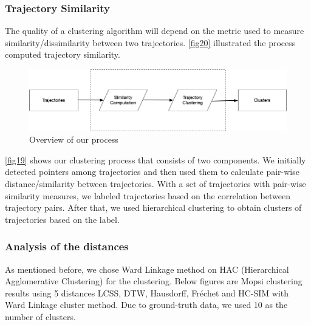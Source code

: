\documentclass[a4paper, 12pt]{article}
\begin{document}
\subsubsection{Trajectory Similarity}

The quality of a clustering algorithm will depend on the metric used to measure similarity/dissimilarity between two trajectories. \autoref{fig20} illustrated the process computed trajectory similarity.

\begin{figure}[ht]
    \centering
    \includegraphics[width=1\textwidth]{Process.png}
    \caption{Overview of our process}
    \label{fig19}
\end{figure}

\autoref{fig19} shows our clustering process that consists of two components. We initially detected pointers among trajectories and then used them to calculate pair-wise distance/similarity between trajectories. With a set of trajectories with pair-wise similarity measures, we labeled trajectories based on the correlation between trajectory pairs. After that, we used hierarchical clustering to obtain clusters of trajectories based on the label.

\subsubsection{Analysis of the distances}

As mentioned before, we chose Ward Linkage method on HAC (Hierarchical Agglomerative Clustering) for the clustering. Below figures are Mopsi clustering results using 5 distances LCSS, DTW, Hausdorff, Fréchet and HC-SIM with Ward Linkage cluster method. Due to ground-truth data, we used 10 as the number of clusters.
\end{document}
